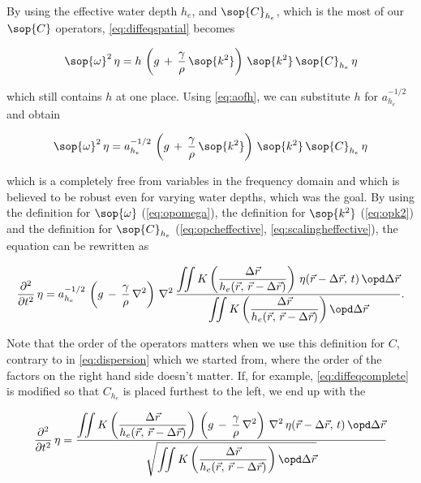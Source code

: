 By using the effective water depth $h_e$, and $\sop{C}_{h_e}$, which is the most  of our $\sop{C}$ operators, \eqref{eq:diffeqspatial} becomes

\begin{equation} \label{eq:diffeqonehstillunknown}
\sop{\omega}^2\,\eta = h\,\left(g\,+\,\frac{\gamma}{\rho}\,\sop{k^2}\right)\,\sop{k^2}\,\sop{C}_{h_e}\,\eta
\end{equation}

which still contains $h$ at one place. Using \eqref{eq:aofh}, we can substitute $h$ for $a_{h_e}^{-1/2}$ and obtain

\begin{equation} \label{eq:diffeqcomplete}
\sop{\omega}^2\,\eta = a_{h_e}^{-1/2}\,\left(g\,+\,\frac{\gamma}{\rho}\,\sop{k^2}\right)\,\sop{k^2}\,\sop{C}_{h_e}\,\eta
\end{equation}

which is a \PDE completely free from variables in the frequency domain and which is believed to be robust even for varying water depths, which was the goal. By using the definition for $\sop{\omega}$ (\eqref{eq:opomega}), the definition for $\sop{k^2}$ (\eqref{eq:opk2}) and the definition for $\sop{C}_{h_e}$ (\eqref{eq:opcheffective}, \eqref{eq:scalingheffective}), the equation can be rewritten as

\begin{equation} \label{eq:diffeqnouserdefinedoperators}
\frac{\partial^2}{\partial t^2}\,\eta = a_{h_e}^{-1/2}\,\left(g\,-\,\frac{\gamma}{\rho}\,\nabla^2\right)\,\nabla^2\,\frac{\displaystyle\iint K\left(\frac{\Delta\vec{r}}{h_e(\vec{r},\,\vec{r}-\Delta\vec{r})}\right)\,\eta(\vec{r}-\Delta\vec{r},\,t)\,\opd\Delta\vec{r}}{\displaystyle\iint K\left(\frac{\Delta\vec{r}}{h_e(\vec{r},\,\vec{r}-\Delta\vec{r})}\right) \opd\Delta\vec{r}}.
\end{equation}

Note that the order of the operators matters when we use this definition for $C$, contrary to in \eqref{eq:dispersion} which we started from, where the order of the factors on the right hand side doesn't matter. If, for example, \eqref{eq:diffeqcomplete} is modified so that $C_{h_e}$ is placed furthest to the left, we end up with the \PDE

\begin{equation} \label{eq:diffeqnouserdefinedoperatorsvariant}
\frac{\partial^2}{\partial t^2}\,\eta = \frac{\displaystyle\iint K\left(\frac{\Delta\vec{r}}{h_e(\vec{r},\,\vec{r}-\Delta\vec{r})}\right)\,\left(g\,-\,\frac{\gamma}{\rho}\,\nabla^2\right)\,\nabla^2\,\eta(\vec{r}-\Delta\vec{r},\,t)\,\opd\Delta\vec{r}}{\sqrt{\displaystyle\iint K\left(\frac{\Delta\vec{r}}{h_e(\vec{r},\,\vec{r}-\Delta\vec{r})}\right) \opd\Delta\vec{r}}}
\end{equation}

